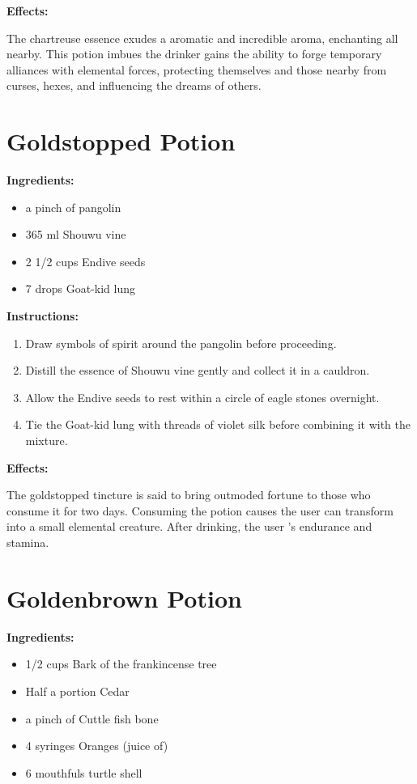\documentclass{article}
\begin{document}
\textbf{Effects:}

The chartreuse essence exudes a aromatic and incredible aroma, enchanting all nearby. This potion imbues the drinker gains the ability to forge temporary alliances with elemental forces, protecting themselves and those nearby from curses, hexes, and influencing the dreams of others.

\newpage
\section*{Goldstopped Potion}

\textbf{Ingredients:}

\begin{itemize}
  \item a pinch of pangolin
  \item 365 ml Shouwu vine
  \item 2 1/2 cups Endive seeds
  \item 7 drops Goat-kid lung
\end{itemize}

\textbf{Instructions:}

\begin{enumerate}
  \item Draw symbols of spirit around the pangolin before proceeding.
  \item Distill the essence of Shouwu vine gently and collect it in a cauldron.
  \item Allow the Endive seeds to rest within a circle of eagle stones overnight.
  \item Tie the Goat-kid lung with threads of violet silk before combining it with the mixture.
\end{enumerate}

\textbf{Effects:}

The goldstopped tincture is said to bring outmoded fortune to those who consume it for two days. Consuming the potion causes the user can transform into a small elemental creature. After drinking, the user 's endurance and stamina.

\newpage
\section*{Goldenbrown Potion}

\textbf{Ingredients:}

\begin{itemize}
  \item 1/2 cups Bark of the frankincense tree
  \item Half a portion Cedar
  \item a pinch of Cuttle fish bone
  \item 4 syringes Oranges (juice of)
  \item 6 mouthfuls turtle shell
\end{itemize}
\end{document}
